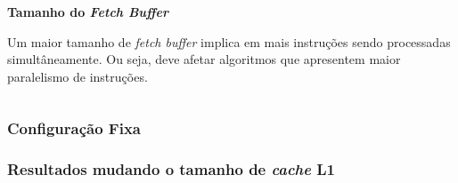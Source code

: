 \documentclass{beamer}
\begin{document}
\begin{frame}
\begin{columns}
\begin{column}{0.3\textwidth}
\begin{center}
                    \Large
                    \textbf{Tamanho do \textit{Fetch Buffer}}
                \end{center}

                \justifying
                \footnotesize
                Um maior tamanho de \textit{fetch buffer} implica em mais instruções sendo processadas simultâneamente. Ou seja,
                deve afetar algoritmos que apresentem maior paralelismo de instruções.

            \end{column}
        \end{columns}

    \end{frame}

    \begin{frame}
        \frametitle{Configuração Fixa}

        \begin{figure}[h]
            \centering
        \end{figure}

    \end{frame}

    \begin{frame}
        \frametitle{Resultados mudando o tamanho de \textit{cache} L1}

        \begin{figure}[h]
            \centering
        \end{figure}

    \end{frame}
\end{document}

